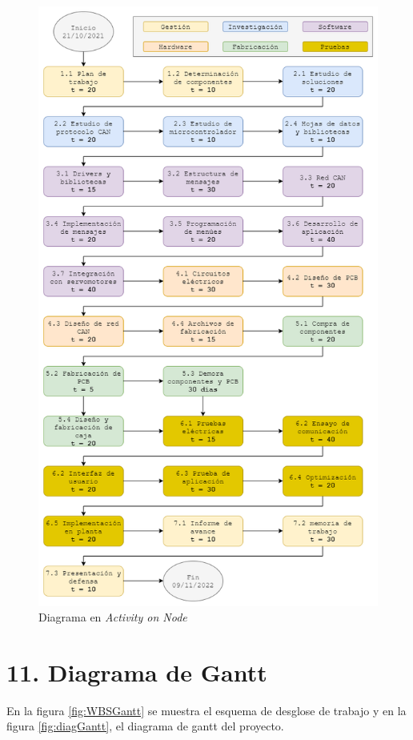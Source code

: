 \documentclass[
11pt, %
]{charter}
\begin{document}
\begin{figure}[htpb]
\centering 
\includegraphics[width=.8\textwidth]{./Figuras/GdP_AoN.png}
\caption{Diagrama en \textit{Activity on Node}}
\label{fig:AoN}
\end{figure}

\section{11. Diagrama de Gantt}
\label{sec:gantt}

En la figura \ref{fig:WBSGantt} se muestra el esquema de desglose de trabajo y en la figura \ref{fig:diagGantt}, el diagrama de gantt del proyecto.
\end{document}
